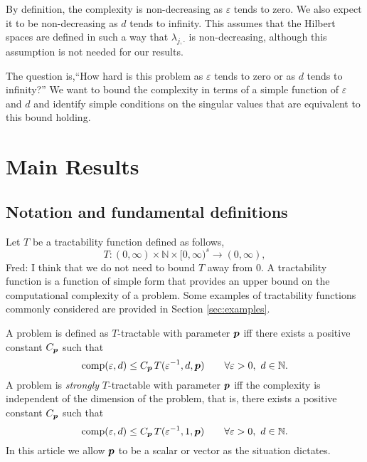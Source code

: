 \documentclass[11pt,a4paper]{article}
\newcommand{\fred}[1]{\begingroup\color{blue}Fred: #1\endgroup}
\begin{document}
By definition, the complexity is non-decreasing  as $\varepsilon$ tends to zero.  We also expect it to be non-decreasing as $d$ tends to infinity.  This assumes that the Hilbert spaces are defined in such a way that $\lambda_{j,\cdot}$ is non-decreasing, although this assumption is not needed for our results.  

The question is,``How hard is this problem as $\varepsilon$ tends to zero or as $d$ tends to infinity?''  We want to bound the complexity in terms of a simple function of $\varepsilon$ and $d$ and identify simple conditions on the singular values that are equivalent to this bound holding.

\section{Main Results}

\subsection{Notation and fundamental definitions}
Let $T$ be a tractability function defined as follows,
\[
T :(0,\infty) \times \mathbb{N} \times [0,\infty)^s \rightarrow (0,\infty),
\]
\fred{I think that we do not need to bound $T$ away from $0$.}
A tractability function is a function of simple form that provides an upper bound on the computational complexity of a problem.  Some examples of tractability functions commonly considered are provided in Section \ref{sec:examples}.


A problem is defined as $T$-tractable with parameter $\boldsymbol{p}$ iff there exists a positive constant $C_{\boldsymbol{p}}$ such that
\begin{equation} \label{eq:tract_def}
	\operatorname{comp}(\varepsilon,d) \le C_{\boldsymbol{p}}\, T(\varepsilon^{-1},d,\boldsymbol{p}) \qquad \forall \varepsilon >0, \ d \in \mathbb{N}.
\end{equation}
A problem is \emph{strongly}
$T$-tractable with parameter $\boldsymbol{p}$ iff the complexity is independent of the dimension of the problem, that is, there exists a positive constant $C_{\boldsymbol{p}}$ such that
\begin{equation} \label{eq:strong_tract_def}
	\operatorname{comp}(\varepsilon,d) \le C_{\boldsymbol{p}}\, T(\varepsilon^{-1},1,\boldsymbol{p}) \qquad \forall \varepsilon >0 , \ d \in \mathbb{N}.
\end{equation}
In this article we allow $\boldsymbol{p}$ to be a scalar or vector as the situation dictates.
\end{document}
